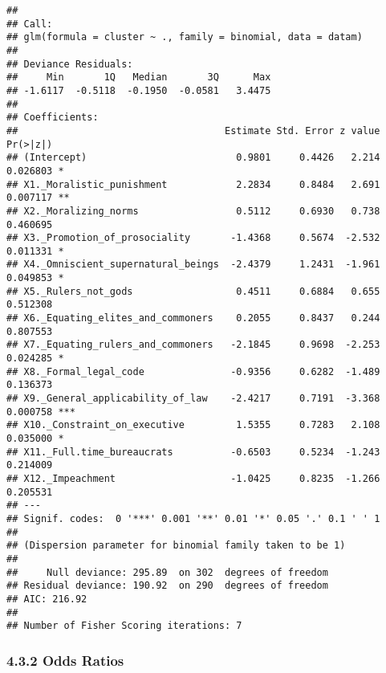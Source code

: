 \documentclass[
]{article}
\newenvironment{Shaded}{\begin{snugshade}}{\end{snugshade}}
\newcommand{\KeywordTok}[1]{\textcolor[rgb]{0.13,0.29,0.53}{\textbf{#1}}}
\newcommand{\NormalTok}[1]{#1}
\newcommand{\OperatorTok}[1]{\textcolor[rgb]{0.81,0.36,0.00}{\textbf{#1}}}
\begin{document}
\begin{verbatim}
## 
## Call:
## glm(formula = cluster ~ ., family = binomial, data = datam)
## 
## Deviance Residuals: 
##     Min       1Q   Median       3Q      Max  
## -1.6117  -0.5118  -0.1950  -0.0581   3.4475  
## 
## Coefficients:
##                                    Estimate Std. Error z value Pr(>|z|)    
## (Intercept)                          0.9801     0.4426   2.214 0.026803 *  
## X1._Moralistic_punishment            2.2834     0.8484   2.691 0.007117 ** 
## X2._Moralizing_norms                 0.5112     0.6930   0.738 0.460695    
## X3._Promotion_of_prosociality       -1.4368     0.5674  -2.532 0.011331 *  
## X4._Omniscient_supernatural_beings  -2.4379     1.2431  -1.961 0.049853 *  
## X5._Rulers_not_gods                  0.4511     0.6884   0.655 0.512308    
## X6._Equating_elites_and_commoners    0.2055     0.8437   0.244 0.807553    
## X7._Equating_rulers_and_commoners   -2.1845     0.9698  -2.253 0.024285 *  
## X8._Formal_legal_code               -0.9356     0.6282  -1.489 0.136373    
## X9._General_applicability_of_law    -2.4217     0.7191  -3.368 0.000758 ***
## X10._Constraint_on_executive         1.5355     0.7283   2.108 0.035000 *  
## X11._Full.time_bureaucrats          -0.6503     0.5234  -1.243 0.214009    
## X12._Impeachment                    -1.0425     0.8235  -1.266 0.205531    
## ---
## Signif. codes:  0 '***' 0.001 '**' 0.01 '*' 0.05 '.' 0.1 ' ' 1
## 
## (Dispersion parameter for binomial family taken to be 1)
## 
##     Null deviance: 295.89  on 302  degrees of freedom
## Residual deviance: 190.92  on 290  degrees of freedom
## AIC: 216.92
## 
## Number of Fisher Scoring iterations: 7
\end{verbatim}

\hypertarget{odds-ratios}{%
\subsubsection{4.3.2 Odds Ratios}\label{odds-ratios}}

\begin{Shaded}
\end{Shaded}
\end{document}
